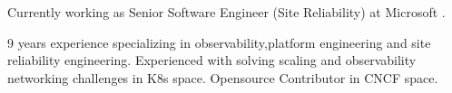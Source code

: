 

\begin{cvparagraph}

Currently working as Senior Software Engineer (Site Reliability) at Microsoft .

 9 years experience specializing in observability,platform engineering and site reliability engineering.
 Experienced with solving scaling and observability networking challenges in K8s space.
 Opensource Contributor in CNCF space.
\end{cvparagraph}
